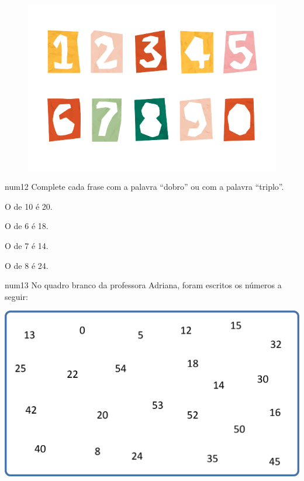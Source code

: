 \begin{figure}[htpb!]
\centering
\includegraphics[width=.7\textwidth]{./media/image16c.png}
\end{figure}

num{12} Complete cada frase com a palavra ``dobro'' ou com a palavra ``triplo''.

\begin{escolha}
\item
  O  de 10 é 20.
\item
  O  de 6 é 18.
\item
  O  de 7 é 14.
\item
  O  de 8 é 24.
\end{escolha}

\pagebreak
num{13} No quadro branco da professora Adriana, foram escritos os números a seguir:


\vspace{2em}
\includegraphics[width=\textwidth]{./media/image25.png}
\vspace{2em}

